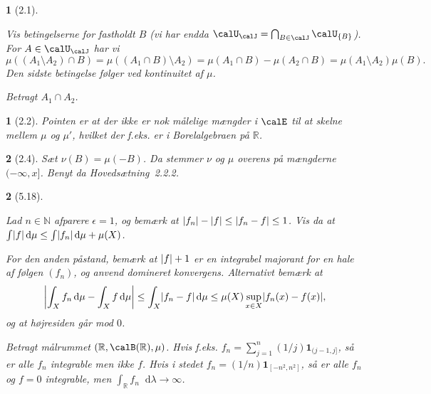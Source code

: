 \documentclass[a4paper, 11pt, article, danish, oneside]{memoir}
\title{\doctitle}
\author{\docauthor}
\newcommand{\naturals}{\mathbb{N}}
\newcommand{\reals}{\mathbb{R}}
\newcommand{\blank}{\mathrel{\;\cdot\;}}
\newcommand{\blankifempty}[1]{\ifstrempty{#1}{\blank}{#1}}
\DeclarePairedDelimiter{\auxdelimlvert}{\lvert}{\rvert}
\newcommand{\abs}[2][]{\auxdelimlvert[#1]{\blankifempty{#2}}}
\DeclarePairedDelimiter{\auxdelimparen}{(}{)}
\newcommand{\borel}[2][]{\calB\auxdelimparen[#1]{#2}}
\newcommand{\dif}{\mathop{}\!\mathrm{d}}
\newcommand{\indicator}[1]{\mathbf{1}_{#1}}
\newcommand*\intersect\cap
\DeclareMathOperator*{\smallbigcap}{\textstyle\bigcap}
\DeclareMathOperator*{\bigintersect}{\mathchoice
    {\smallbigcap}%
    {\bigcap}%
    {\bigcap}%
    {\bigcap}%
}
\newcommand{\pencilsymbol}{\raisebox{-2pt}{\normalfont\PencilLeft}}
\theoremstyle{changedotcustomnumber}
\newtheorem{opgave}{\pencilsymbol}
\theoremstyle{changedotbreakcustomnumber}
\newtheorem{opgavebreak}{\pencilsymbol}
\begin{document}
\maketitle


\begin{opgavebreak}[2.1]
\begin{solutionsec}
    \item Vis betingelserne for fastholdt $B$ (vi har endda $\calU_\calJ = \bigintersect_{B \in \calJ} \calU_{\{B\}}$). For $A \in \calU_\calJ$ har vi
    \begin{equation*}
        \mu((A_1 \setminus A_2) \intersect B)
            = \mu((A_1 \intersect B) \setminus A_2)
            = \mu(A_1 \intersect B) - \mu(A_2 \intersect B)
            = \mu(A_1 \setminus A_2) \mu(B).
    \end{equation*}
    Den sidste betingelse følger ved kontinuitet af $\mu$.

    \item Betragt $A_1 \intersect A_2$.
\end{solutionsec}
\end{opgavebreak}


\begin{opgave}[2.2]
    Pointen er at der ikke er nok målelige mængder i $\calE$ til at skelne mellem $\mu$ og $\mu'$, hvilket der f.eks. er i Borelalgebraen på $\reals$.
\end{opgave}


\begin{opgave}[2.4]
    Sæt $\nu(B) = \mu(-B)$. Da stemmer $\nu$ og $\mu$ overens på mængderne $(-\infty,x]$. Benyt da Hovedsætning~2.2.2.
\end{opgave}


\begin{opgavebreak}[5.18]
\begin{solutionsec}
    \item Lad $n \in \naturals$ afparere $\epsilon = 1$, og bemærk at $\abs{f_n} - \abs{f} \leq \abs{f_n - f} \leq 1$. Vis da at $\int \abs{f} \dif\mu \leq \int \abs{f_n} \dif\mu + \mu(X)$.

    For den anden påstand, bemærk at $\abs{f} + 1$ er en integrabel majorant for en hale af følgen $(f_n)$, og anvend domineret konvergens. Alternativt bemærk at
    \begin{equation*}
        \abs[\bigg]{ \int_X f_n \dif\mu - \int_X f \dif\mu }
            \leq \int_X \abs{ f_n - f } \dif\mu
            \leq \mu(X) \sup_{x \in X} \abs{f_n(x) - f(x)},
    \end{equation*}
    og at højresiden går mod $0$.

    \item Betragt målrummet $(\reals,\borel{\reals},\mu)$. Hvis f.eks. $f_n = \sum_{j=1}^n (1/j) \indicator{(j-1,j]}$, så er alle $f_n$ integrable men ikke $f$. Hvis i stedet $f_n = (1/n) \indicator{[-n^2,n^2]}$, så er alle $f_n$ og $f = 0$ integrable, men $\int_\reals f_n \dif\lambda \to \infty$.
\end{solutionsec}
\end{opgavebreak}
\end{document}
